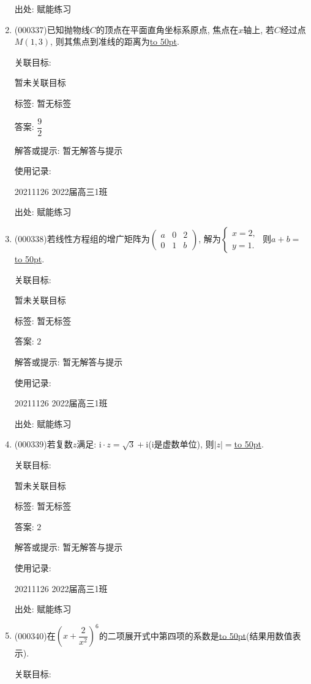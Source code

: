 \documentclass[10pt,a4paper]{article}
\newcommand{\blank}[1]{\underline{\hbox to #1pt{}}}
\begin{document}
\begin{enumerate}[1.]
出处: 赋能练习
\item { (000337)}已知抛物线$C$的顶点在平面直角坐标系原点, 焦点在$x$轴上, 若$C$经过点$M(1,3)$, 则其焦点到准线的距离为\blank{50}.


关联目标:

暂未关联目标



标签: 暂无标签

答案: $\dfrac 92$

解答或提示: 暂无解答与提示

使用记录:

20211126	2022届高三1班	


出处: 赋能练习
\item { (000338)}若线性方程组的增广矩阵为$\begin{pmatrix}    a & 0 & 2 \\ 0 & 1 & b\end{pmatrix}$, 解为$\begin{cases}    x=2, \\ y=1.\end{cases}$ 则$a+b=$\blank{50}.


关联目标:

暂未关联目标



标签: 暂无标签

答案: $2$

解答或提示: 暂无解答与提示

使用记录:

20211126	2022届高三1班	


出处: 赋能练习
\item { (000339)}若复数$z$满足: $\mathrm{i}\cdot z=\sqrt{3}+\mathrm{i}$($\mathrm{i}$是虚数单位), 则$|z|=$\blank{50}.


关联目标:

暂未关联目标



标签: 暂无标签

答案: $2$

解答或提示: 暂无解答与提示

使用记录:

20211126	2022届高三1班	


出处: 赋能练习
\item { (000340)}在$(x+\dfrac{2}{x^2})^6$的二项展开式中第四项的系数是\blank{50}(结果用数值表示).


关联目标:


\end{enumerate}
\end{document}
